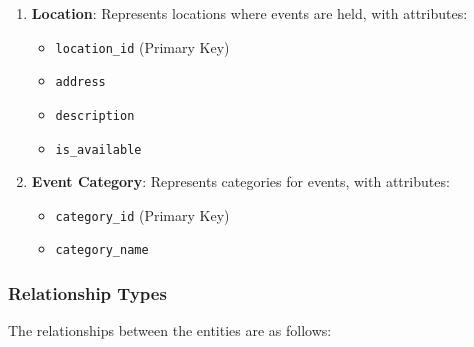 \begin{enumerate}
    \item \textbf{Location}: Represents locations where events are held, with attributes:
    \begin{itemize}
        \item \texttt{location\_id} (Primary Key)
        \item \texttt{address}
        \item \texttt{description}
        \item \texttt{is\_available}
    \end{itemize}

    \item \textbf{Event Category}: Represents categories for events, with attributes:
    \begin{itemize}
        \item \texttt{category\_id} (Primary Key)
        \item \texttt{category\_name}
    \end{itemize}
\end{enumerate}

\subsubsection{Relationship Types}

The relationships between the entities are as follows:

